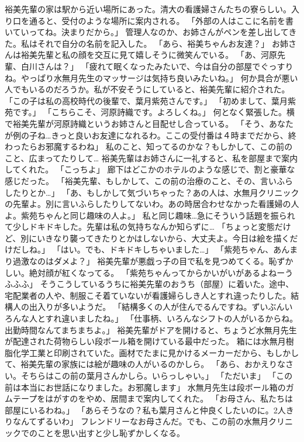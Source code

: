 裕美先輩の家は駅から近い場所にあった。清大の看護婦さんたちの寮らしい。入り口を通ると、受付のような場所に案内される。
「外部の人はここに名前を書いていってね。決まりだから。」
管理人なのか、お姉さんがペンを差し出してきた。私はそれで自分の名前を記入した。
「あら、裕美ちゃんお友達？」
お姉さんは裕美先輩と私の顔を交互に見て嬉しそうに微笑んでいる。
「あ、河原先輩、白川さんは？」
「疲れて眠くなったみたいで、今は自分の部屋でぐっすりね。やっぱり水無月先生のマッサージは気持ち良いみたいね。」
何か具合が悪い人でもいるのだろうか。私が不安そうにしていると、裕美先輩に紹介された。
「この子は私の高校時代の後輩で、葉月紫苑さんです。」
「初めまして、葉月紫苑です。」
「こちらこそ、河原詩織です。よろしくね。」
何となく緊張した。横で裕美先輩が河原詩織というお姉さんと目配せし合っている。
「そう、あなたが例の子ね…きっと良いお友達になれるわ。ここの受付番は４時までだから、終わったらお邪魔するわね」
私のこと、知ってるのかな？もしかして、この前のこと、広まってたりして…
裕美先輩はお姉さんに一礼すると、私を部屋まで案内してくれた。
「こっちよ」
廊下はどこかのホテルのような感じで、割と豪華な感じだった。
「裕美先輩、もしかして、この前の治療のこと、その、言いふらしたりとか…」
「あ、もしかして気づいちゃった？あの人は、水無月クリニックの先輩よ。別に言いふらしたりしてないわ。あの時居合わせなかった看護婦の人よ。紫苑ちゃんと同じ趣味の人よ。」
私と同じ趣味…急にそういう話題を振られて少しドキドキした。先輩は私の気持ちなんか知らずに…
「ちょっと変態だけど、別にいきなり襲ってきたりとかはしないから、大丈夫よ。今日は絵を描くだけだしね。」
「はい。でも、ドキドキしちゃいました…」
「紫苑ちゃん、あんまり過激なのはダメよ？」
裕美先輩が悪戯っ子の目で私を見つめてくる。恥ずかしい。絶対顔が紅くなってる。
「紫苑ちゃんってからかいがいがあるよねーうふふふ」
そうこうしているうちに裕美先輩のおうち（部屋）に着いた。途中、宅配業者の人や、制服こそ着ていないが看護婦らしき人とすれ違ったりした。結構人の出入りが多いようだ。
「結構多くの人が住んでるんですね。ずいぶんいろんな人とすれ違いましたね。」
「仕事柄、いろんなシフトの人がいるからね。出勤時間なんてまちまちよ。」
裕美先輩がドアを開けると、ちょうど水無月先生が配達された荷物らしい段ボール箱を開けている最中だった。
箱には水無月樹脂化学工業と印刷されていた。画材でたまに見かけるメーカーだから、もしかして、裕美先輩の家族には絵が趣味の人がいるのかしら。
「あら、おかえりなさい。そちらはこの前の葉月さんかしら。いらっしゃい。」
「ただいま」
「この前は本当にお世話になりました。お邪魔します」
水無月先生は段ボール箱のガムテープをはがすのをやめ、居間まで案内してくれた。
「お母さん、私たちは部屋にいるわね。」
「あらそうなの？私も葉月さんと仲良くしたいのに。2人きりなんてずるいわ」
フレンドリーなお母さんだ。でも、この前の水無月クリニックでのことを思い出すと少し恥ずかしくなる。
